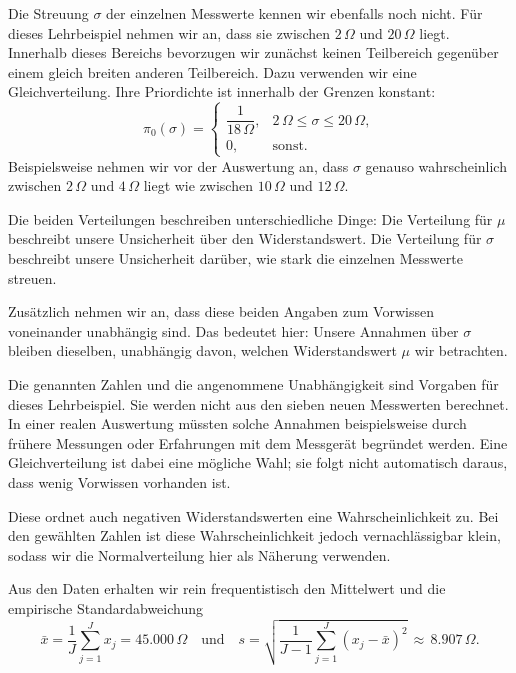 Die Streuung $\sigma$ der einzelnen Messwerte kennen wir
ebenfalls noch nicht. Für dieses Lehrbeispiel nehmen wir an,
dass sie zwischen $2\,\Omega$ und $20\,\Omega$ liegt.
Innerhalb dieses Bereichs bevorzugen wir zunächst
keinen Teilbereich gegenüber einem gleich breiten anderen
Teilbereich. Dazu verwenden wir eine Gleichverteilung.
Ihre Priordichte ist innerhalb der Grenzen konstant:
\begin{equation}
\pi_0(\sigma)=
\begin{cases}
\dfrac{1}{18\,\Omega},
&2\,\Omega\leq\sigma\leq20\,\Omega,\\[4pt]
0,&\text{sonst}.
\end{cases}
\label{T2PriorSigmaBeispiel}
\end{equation}
Beispielsweise nehmen wir vor der Auswertung an, dass
$\sigma$ genauso wahrscheinlich zwischen $2\,\Omega$
und $4\,\Omega$ liegt wie zwischen $10\,\Omega$
und $12\,\Omega$.

Die beiden Verteilungen beschreiben unterschiedliche Dinge:
Die Verteilung für $\mu$ beschreibt unsere Unsicherheit
über den Widerstandswert. Die Verteilung für $\sigma$
beschreibt unsere Unsicherheit darüber, wie stark die
einzelnen Messwerte streuen.

Zusätzlich nehmen wir an, dass diese beiden Angaben zum
Vorwissen voneinander unabhängig sind. Das bedeutet hier:
Unsere Annahmen über $\sigma$ bleiben dieselben,
unabhängig davon, welchen Widerstandswert $\mu$ wir betrachten.

Die genannten Zahlen und die angenommene Unabhängigkeit
sind Vorgaben für dieses Lehrbeispiel. Sie werden nicht
aus den sieben neuen Messwerten berechnet.
In einer realen Auswertung müssten solche Annahmen
beispielsweise durch frühere Messungen oder Erfahrungen
mit dem Messgerät begründet werden.
Eine Gleichverteilung ist dabei eine mögliche Wahl;
sie folgt nicht automatisch daraus, dass wenig Vorwissen
vorhanden ist.


Diese ordnet auch negativen
Widerstandswerten eine Wahrscheinlichkeit zu.
Bei den gewählten Zahlen ist diese Wahrscheinlichkeit
jedoch vernachlässigbar klein, sodass wir die
Normalverteilung hier als Näherung verwenden.


Aus den Daten erhalten wir rein frequentistisch den Mittelwert und die 
empirische Standard\-abweichung
$$
\bar x= \frac{1}{J} \sum\limits_{j=1}^J x_j = 45.000\,\Omega
\quad \text{und} \quad
s = \sqrt{\frac{1}{J-1} \sum\limits_{j=1}^J (x_j - \bar x)^2} \, \approx \, 8.907\,\Omega.
$$

